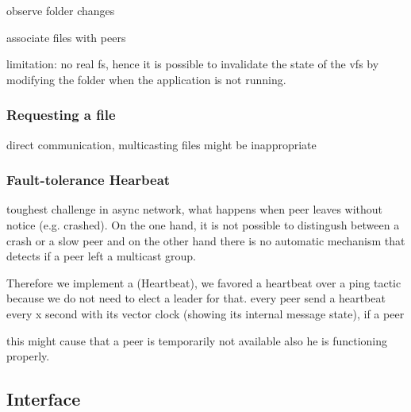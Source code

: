     observe folder changes
    
    associate files with peers
    
    limitation: no real fs, hence it is possible to invalidate the state of the vfs by modifying the folder when the application is not running. 
    
    \subsubsection{Requesting a file}
    
    direct communication, multicasting files might be inappropriate
    
    \subsubsection{Fault-tolerance Hearbeat}
    toughest challenge in async network, what happens when peer leaves without notice (e.g. crashed). On the one hand, it is not possible to distingush between a crash or a slow peer and  on the other hand there is no automatic mechanism that detects if a peer left a multicast group.
    
    Therefore we implement a (Heartbeat), we favored a heartbeat over a ping tactic because we do not need to elect a leader for that. 
    every peer send a heartbeat every x second with its vector clock (showing its internal message state), if a peer 
    
    this might cause that a peer is temporarily not available also he is functioning properly.
    

    
    
    

\subsection{Interface}